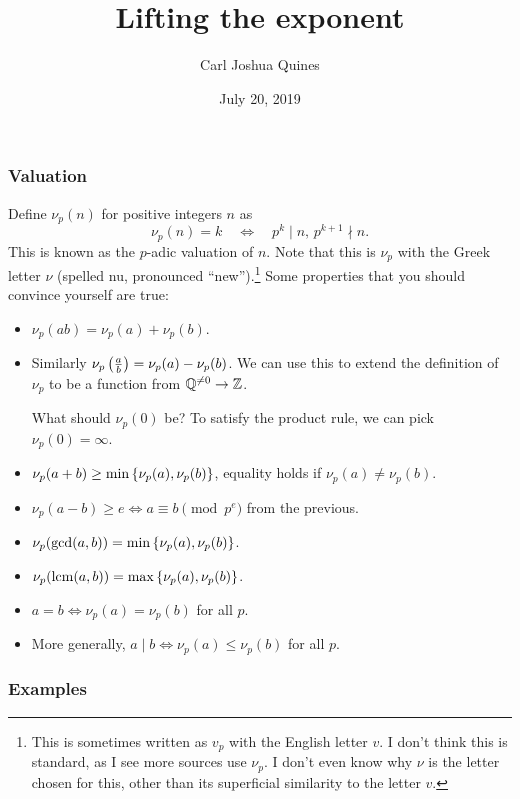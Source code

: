 \documentclass[11pt,paper=letter]{scrartcl}
\begin{document}
\title{Lifting the exponent}

\author{Carl Joshua Quines}

\date{July 20, 2019}

\maketitle

\subsubsection*{Valuation}

Define $\nu_p(n)$ for positive integers $n$ as
$$\nu_p(n) = k \quad \iff \quad p^k \mid n,\,p^{k+1}\nmid n.$$
This is known as the $p$-adic valuation of $n$. Note that this is $\nu_p$ with the Greek letter $\nu$ (spelled nu, pronounced ``new'').\footnote{This is sometimes written as $v_p$ with the English letter $v$. I don't think this is standard, as I see more sources use $\nu_p$. I don't even know why $\nu$ is the letter chosen for this, other than its superficial similarity to the letter $v$.} Some properties that you should convince yourself are true:
\begin{itemize}
  \item $\nu_p(ab) = \nu_p(a) + \nu_p(b)$.
  \item Similarly $\nu_p\left( \frac ab \right) = \nu_p(a) - \nu_p(b)$. We can use this to extend the definition of $\nu_p$ to be a function from $\mathbb Q^{\neq 0} \to \mathbb Z$.

  What should $\nu_p(0)$ be? To satisfy the product rule, we can pick $\nu_p(0) = \infty$.

  \item $\nu_p(a + b) \ge \min\left\{ \nu_p(a), \nu_p(b) \right\}$, equality holds if $\nu_p(a) \neq \nu_p(b)$.
  \item $\nu_p(a - b) \ge e \iff a \equiv b \pmod{p^e}$ from the previous.
  \item $\nu_p(\gcd(a, b)) = \min\left\{ \nu_p(a), \nu_p(b) \right\}$.
  \item $\nu_p(\operatorname*{lcm}(a, b)) = \max\left\{ \nu_p(a), \nu_p(b) \right\}$.
  \item $a = b \iff \nu_p(a) = \nu_p(b)$ for all $p$.
  \item More generally, $a \mid b \iff \nu_p(a) \le \nu_p(b)$ for all $p$.
\end{itemize}

\subsubsection*{Examples}
\end{document}
